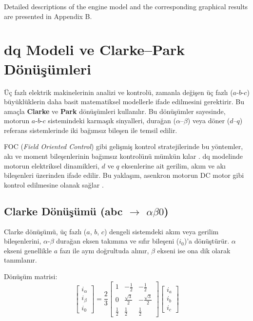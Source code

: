     Detailed descriptions of the engine model and the corresponding graphical results are presented in Appendix B.

\section{dq Modeli ve Clarke–Park Dönüşümleri}

Üç fazlı elektrik makinelerinin analizi ve kontrolü, zamanla değişen üç fazlı ($a$-$b$-$c$) büyüklüklerin daha basit matematiksel modellerle ifade edilmesini gerektirir. Bu amaçla \textbf{Clarke} ve \textbf{Park} dönüşümleri kullanılır. Bu dönüşümler sayesinde, motorun $a$-$b$-$c$ sistemindeki karmaşık sinyalleri, durağan ($\alpha$–$\beta$) veya döner ($d$–$q$) referans sistemlerinde iki bağımsız bileşen ile temsil edilir. 

FOC (\textit{Field Oriented Control}) gibi gelişmiş kontrol stratejilerinde bu yöntemler, akı ve moment bileşenlerinin bağımsız kontrolünü mümkün kılar \cite{blashke1972,leonhard1996control}. dq modelinde motorun elektriksel dinamikleri, $d$ ve $q$ eksenlerine ait gerilim, akım ve akı bileşenleri üzerinden ifade edilir. Bu yaklaşım, asenkron motorun DC motor gibi kontrol edilmesine olanak sağlar \cite{macdonald1979dq}.

\subsection{Clarke Dönüşümü (abc $\rightarrow$ $\alpha\beta0$)}

Clarke dönüşümü, üç fazlı ($a$, $b$, $c$) dengeli sistemdeki akım veya gerilim bileşenlerini, $\alpha$-$\beta$ durağan eksen takımına ve sıfır bileşeni ($i_0$)’a dönüştürür. $\alpha$ ekseni genellikle $a$ fazı ile aynı doğrultuda alınır, $\beta$ ekseni ise ona dik olarak tanımlanır.

Dönüşüm matrisi:
\begin{equation}
\begin{bmatrix}
i_\alpha \\
i_\beta \\
i_0
\end{bmatrix}
=
\frac{2}{3}
\begin{bmatrix}
1 & -\frac{1}{2} & -\frac{1}{2} \\
0 & \frac{\sqrt{3}}{2} & -\frac{\sqrt{3}}{2} \\
\frac12 & \frac12 & \frac12
\end{bmatrix}
\begin{bmatrix}
i_a \\
i_b \\
i_c
\end{bmatrix}
\end{equation}

